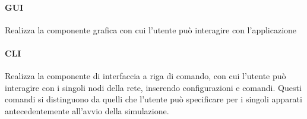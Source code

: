 \paragraph*{GUI} Realizza la componente grafica con cui l'utente può interagire con l'applicazione
\paragraph*{CLI} Realizza la componente di interfaccia a riga di comando, con cui l'utente può interagire con i singoli nodi della rete, inserendo configurazioni e comandi. Questi comandi si distinguono da quelli che l'utente può specificare per i singoli apparati antecedentemente all'avvio della simulazione. 


\newpage